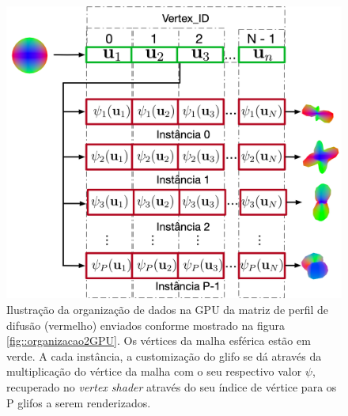 \documentclass[
    12pt,                %
    oneside,            %
    a4paper,            %
    english,            %
    french,                %
    spanish,            %
    brazil                %
    ]{abntex2}
\begin{document}
\begin{figure}[h]
    \centering
    \includegraphics[width=.8\linewidth, angle=0]{figs/Esquema_Glifo/GPU2GlifoGeneral.png}
    \caption{Ilustração da organização de dados na GPU da matriz de perfil de difusão (vermelho) enviados conforme mostrado na figura \ref{fig::organizacao2GPU}. Os vértices da malha esférica estão em verde. A cada instância, a customização do glifo se dá através da multiplicação do vértice da malha com o seu respectivo valor $\psi$, recuperado no \textit{vertex shader} através do seu índice de vértice para os P glifos a serem renderizados.}
    \label{fig::GPU2glifoGeneral}
   \hspace{1pt}
\end{figure}



\end{document}
